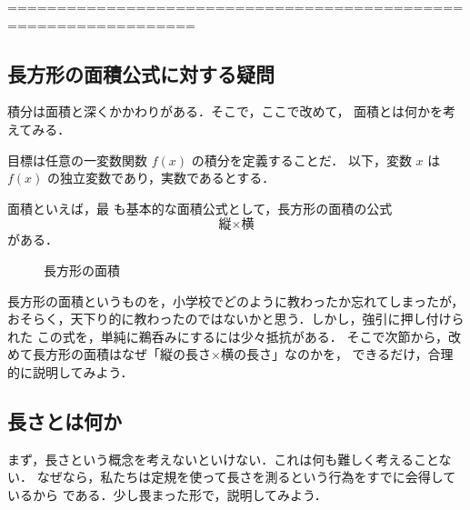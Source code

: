         
        =================================================================
            \subsection{長方形の面積公式に対する疑問}
                積分は面積と深くかかわりがある．そこで，ここで改めて，
                面積とは何かを考えてみる．

                目標は任意の一変数関数 $f(x)$ の積分を定義することだ．
                以下，変数 $x$ は $f(x)$ の独立変数であり，実数であるとする．

                面積といえば，最
                も基本的な面積公式として，長方形の面積の公式
                    \begin{equation*}
                        \mbox{縦} \times \mbox{横}
                    \end{equation*}
                がある．
                    \begin{figure}[hbt]
                        \begin{center}
                            \caption{長方形の面積}
                            \label{fig:ChouhoukeiMenseki}
                        \end{center}
                    \end{figure}

                長方形の面積というものを，小学校でどのように教わったか忘れてしまったが，
                おそらく，天下り的に教わったのではないかと思う．しかし，強引に押し付けられた
                この式を，単純に鵜呑みにするには少々抵抗がある．
                そこで次節から，改めて長方形の面積はなぜ「縦の長さ$\times$横の長さ」なのかを，
                できるだけ，合理的に説明してみよう．

            \subsection{長さとは何か}
                まず，長さという概念を考えないといけない．これは何も難しく考えることない．
                なぜなら，私たちは定規を使って長さを測るという行為をすでに会得しているから
                である．少し畏まった形で，説明してみよう．

